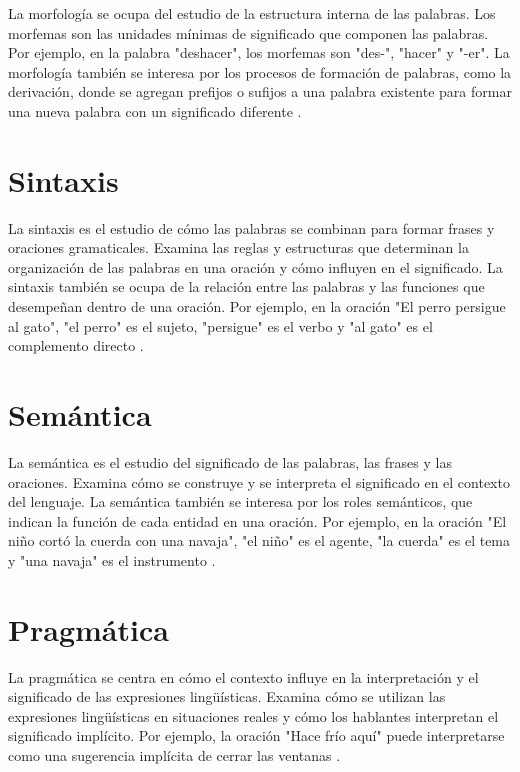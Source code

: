\documentclass{book}
\begin{document}
La morfología se ocupa del estudio de la estructura interna de las palabras. Los morfemas son las unidades mínimas de significado que componen las palabras. Por ejemplo, en la palabra "deshacer", los morfemas son "des-", "hacer" y "-er". La morfología también se interesa por los procesos de formación de palabras, como la derivación, donde se agregan prefijos o sufijos a una palabra existente para formar una nueva palabra con un significado diferente \cite{JohnsonMLSS}.

\section{Sintaxis}

La sintaxis es el estudio de cómo las palabras se combinan para formar frases y oraciones gramaticales. Examina las reglas y estructuras que determinan la organización de las palabras en una oración y cómo influyen en el significado. La sintaxis también se ocupa de la relación entre las palabras y las funciones que desempeñan dentro de una oración. Por ejemplo, en la oración "El perro persigue al gato", "el perro" es el sujeto, "persigue" es el verbo y "al gato" es el complemento directo \cite{JohnsonMLSS}.

\section{Semántica}

La semántica es el estudio del significado de las palabras, las frases y las oraciones. Examina cómo se construye y se interpreta el significado en el contexto del lenguaje. La semántica también se interesa por los roles semánticos, que indican la función de cada entidad en una oración. Por ejemplo, en la oración "El niño cortó la cuerda con una navaja", "el niño" es el agente, "la cuerda" es el tema y "una navaja" es el instrumento \cite{JohnsonMLSS}.

\section{Pragmática}

La pragmática se centra en cómo el contexto influye en la interpretación y el significado de las expresiones lingüísticas. Examina cómo se utilizan las expresiones lingüísticas en situaciones reales y cómo los hablantes interpretan el significado implícito. Por ejemplo, la oración "Hace frío aquí" puede interpretarse como una sugerencia implícita de cerrar las ventanas \cite{fromkin2018introduction}.
\end{document}

